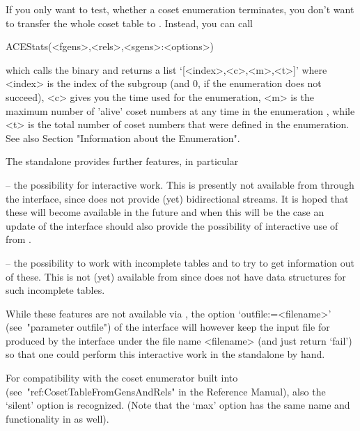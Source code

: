 If you only want to  test, whether a coset enumeration terminates, you
don't want to  transfer the whole coset table  to {\GAP}. Instead, you
can call

\>ACEStats(<fgens>,<rels>,<sgens>:<options>)

which    calls    the   {\ACE}    binary    and    returns   a    list
`[<index>,<c>,<m>,<t>]'  where <index>  is the  index of  the subgroup
(and $0$, if the enumeration does not succeed), <c> gives you the time
used for the  enumeration, <m> is the maximum  number of 'alive' coset
numbers at any time in the enumeration , while <t> is the total number
of  coset numbers  that  were  defined in  the  enumeration. See  also
Section "Information about the Enumeration".


The  {\ACE} standalone  provides further  features, in  particular 

\beginlist

\item{--} the possibility for  interactive work. This is presently not
available  from {\GAP} through  the interface,  since {\GAP}  does not
provide  (yet) bidirectional  streams.  It is  hoped  that these  will
become  available in  the future  and when  this will  be the  case an
update  of  the  interface  should  also provide  the  possibility  of
interactive use of {\ACE} from {\GAP}.

\item{--} the possibility to work with incomplete tables and to try to
get information out of these.  This is not (yet) available from {\GAP}
since {\GAP} does not have data structures for such incomplete tables.

\endlist

While  these  features  are  not  available  via  {\GAP},  the  option
`outfile:=<filename>' (see~"parameter outfile")  of the interface will
however  keep  the  input  file  for {\ACE}  produced  by  the  {\GAP}
interface under the  file name <filename> (and just  return `fail') so
that  one could  perform this  interactive work  in the  standalone by
hand.

For  compatibility  with  the   coset  enumerator  built  into  {\GAP}
(see~"ref:CosetTableFromGensAndRels"  in the  Reference  Manual), also
the `silent' option is recognized. (Note that the `max' option has the
same name and functionality in {\ACE} as well).

